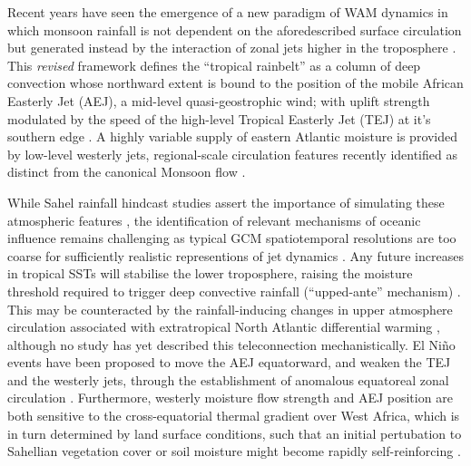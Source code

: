 \documentclass[a4paper]{article}
\begin{document}
Recent years have seen the emergence of a new paradigm of WAM dynamics in which monsoon rainfall is not dependent on the aforedescribed surface circulation  but generated instead by the interaction of zonal jets higher in the troposphere \parencite{grist2001study}.
This \emph{revised} framework \parencite[see][for a comprehensive overview]{nicholson2009revised} defines the ``tropical rainbelt'' as a column of deep convection whose northward extent is bound to the position of the mobile African Easterly Jet (AEJ), a mid-level quasi-geostrophic wind; with uplift strength modulated by the speed of the high-level Tropical Easterly Jet (TEJ) at it's southern edge \parencite{gu2004seasonal, nicholson2009revised, nicholson2013west}.
A highly variable supply of eastern Atlantic moisture is provided by low-level westerly jets, regional-scale circulation features recently identified as distinct from the canonical Monsoon flow \parencite{grodsky2003near, pu2010dynamics, nicholson2013west}.

While Sahel rainfall hindcast studies assert the importance of simulating these atmospheric features \parencite{philippon2010skill, xue2010intercomparison, ruti2011west, diallo2013interannual}, the identification of relevant mechanisms of oceanic influence remains challenging as typical GCM spatiotemporal resolutions are too coarse for sufficiently realistic representions of jet dynamics \parencite{caminade2010twentieth, druyan2011studies, tseng2016diagnosing, vellinga2016sahel, whittleston2017climate}.
Any future increases in tropical SSTs will stabilise the lower troposphere, raising the moisture threshold required to trigger deep convective rainfall (``upped-ante'' mechanism) \parencite{neelin2003tropical, caminade2010twentieth, liu2014atmospheric}. 
This may be counteracted by the rainfall-inducing changes in upper atmosphere circulation associated with extratropical North Atlantic differential warming \parencite{liu2014atmospheric, martin2014impact, park2015northern, monerie2016range}, although no study has yet described this teleconnection mechanistically.
El Ni\~{n}o events have been proposed to move the AEJ equatorward, and weaken the TEJ and the westerly jets, through the establishment of anomalous equatoreal zonal circulation \parencite{joly2009influence, okonkwo2015combined, villamayor2015robust, preethi2015impacts}.
Furthermore, westerly moisture flow strength and AEJ position are both sensitive to the cross-equatorial thermal gradient over West Africa, which is in turn determined by land surface conditions, such that an initial pertubation to Sahellian vegetation cover or soil moisture might become rapidly self-reinforcing \parencite{cook1999generation, thorncroft1999maintenance, patricola2008atmosphere, pu2012role, liu2014atmospheric, berg2017soil}.
\end{document}
